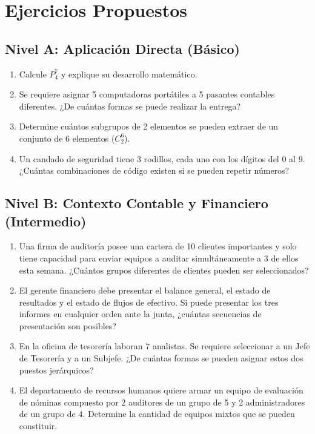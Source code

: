 \documentclass[12pt,letterpaper]{book}
\begin{document}
\section{Ejercicios Propuestos}

\subsection*{Nivel A: Aplicación Directa (Básico)}
\begin{enumerate}[label=\textbf{\arabic*.}]
    \item Calcule $P_{4}^{7}$ y explique su desarrollo matemático.
    \item Se requiere asignar 5 computadoras portátiles a 5 pasantes contables diferentes. ¿De cuántas formas se puede realizar la entrega?
    \item Determine cuántos subgrupos de 2 elementos se pueden extraer de un conjunto de 6 elementos ($C_{2}^{6}$).
    \item Un candado de seguridad tiene 3 rodillos, cada uno con los dígitos del 0 al 9. ¿Cuántas combinaciones de código existen si se pueden repetir números?
\end{enumerate}

\subsection*{Nivel B: Contexto Contable y Financiero (Intermedio)}
\begin{enumerate}[label=\textbf{\arabic*.}, start=5]
    \item Una firma de auditoría posee una cartera de 10 clientes importantes y solo tiene capacidad para enviar equipos a auditar simultáneamente a 3 de ellos esta semana. ¿Cuántos grupos diferentes de clientes pueden ser seleccionados?
    \item El gerente financiero debe presentar el balance general, el estado de resultados y el estado de flujos de efectivo. Si puede presentar los tres informes en cualquier orden ante la junta, ¿cuántas secuencias de presentación son posibles?
    \item En la oficina de tesorería laboran 7 analistas. Se requiere seleccionar a un Jefe de Tesorería y a un Subjefe. ¿De cuántas formas se pueden asignar estos dos puestos jerárquicos?
    \item El departamento de recursos humanos quiere armar un equipo de evaluación de nóminas compuesto por 2 auditores de un grupo de 5 y 2 administradores de un grupo de 4. Determine la cantidad de equipos mixtos que se pueden constituir.
\end{enumerate}
\end{document}

